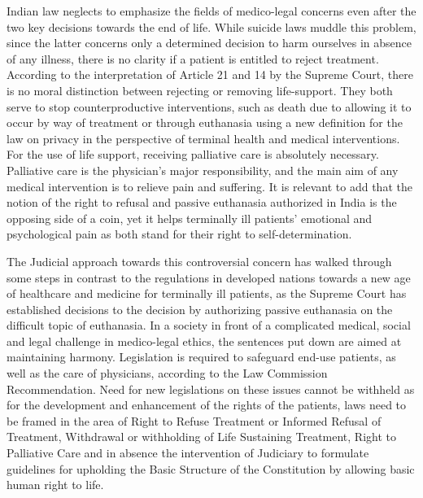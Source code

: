 \begin{multicols}{2}

\noi
Indian law neglects to emphasize the fields of medico-legal concerns even after the two key
decisions towards the end of life. While suicide laws muddle this problem, since the latter
concerns only a determined decision to harm ourselves in absence of any illness, there is no
clarity if a patient is entitled to reject treatment. According to the interpretation of Article 21
and 14 by the Supreme Court, there is no moral distinction between rejecting or removing
life-support. They both serve to stop counterproductive interventions, such as death due to
allowing it to occur by way of treatment or through euthanasia using a new definition for the
law on privacy in the perspective of terminal health and medical interventions. For the use of 
life support, receiving palliative care is absolutely necessary. Palliative care is the physician’s
major responsibility, and the main aim of any medical intervention is to relieve pain and
suffering. It is relevant to add that the notion of the right to refusal and passive euthanasia
authorized in India is the opposing side of a coin, yet it helps terminally ill patients’
emotional and psychological pain as both stand for their right to self-determination.

\noi
The Judicial approach towards this controversial concern has walked through some steps in
contrast to the regulations in developed nations towards a new age of healthcare and medicine
for terminally ill patients, as the Supreme Court has established decisions to the decision by
authorizing passive euthanasia on the difficult topic of euthanasia. In a society in front of a
complicated medical, social and legal challenge in medico-legal ethics, the sentences put
down are aimed at maintaining harmony. Legislation is required to safeguard end-use
patients, as well as the care of physicians, according to the Law Commission
Recommendation. Need for new legislations on these issues cannot be withheld as for the
development and enhancement of the rights of the patients, laws need to be framed in the area
of Right to Refuse Treatment or Informed Refusal of Treatment, Withdrawal or withholding
of Life Sustaining Treatment, Right to Palliative Care and in absence the intervention of
Judiciary to formulate guidelines for upholding the Basic Structure of the Constitution by
allowing basic human right to life.

\end{multicols}
\label{end2019-art6}
